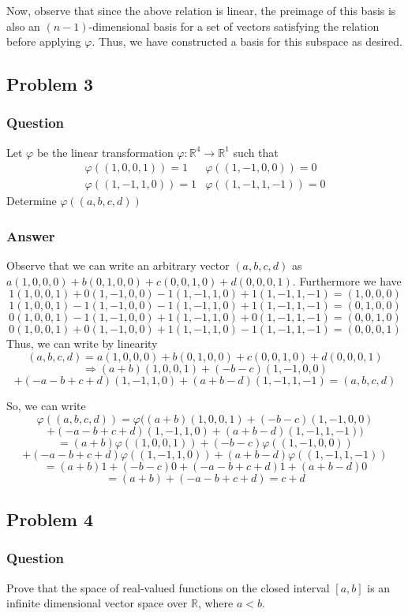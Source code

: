 \documentclass[12pt]{article}
\begin{document}
Now, observe that since the above relation is linear, the preimage of this basis is also an $(n-1)$-dimensional basis for a set of vectors satisfying the relation before applying $\varphi$. Thus, we have constructed a basis for this subspace as desired.
\subsection{Problem 3}

\subsubsection{Question}
Let $\varphi$ be the linear transformation $\varphi: \mathbb{R}^4 \to \mathbb{R}^1$ such that 
\[\begin{array}{ll}
\varphi((1,0,0,1))=1 & \varphi((1,-1,0,0))=0\\
\varphi((1,-1,1,0))=1 & \varphi((1,-1,1,-1))=0
\end{array}\]
Determine $\varphi((a,b,c,d))$
\subsubsection{Answer}
Observe that we can write an arbitrary vector $(a,b,c,d)$ as $a(1,0,0,0)+b(0,1,0,0)+c(0,0,1,0)+d(0,0,0,1)$. Furthermore we have 
\[1(1,0,0,1)+ 0(1,-1,0,0) -1(1,-1,1,0)+ 1(1,-1,1,-1) = (1,0,0,0)\]
\[1(1,0,0,1)-1(1,-1,0,0) -1(1,-1,1,0)+ 1(1,-1,1,-1) = (0,1,0,0)\]
\[0(1,0,0,1)-1(1,-1,0,0) +1(1,-1,1,0)+ 0(1,-1,1,-1) = (0,0,1,0)\]
\[0(1,0,0,1)+ 0(1,-1,0,0) +1(1,-1,1,0)- 1(1,-1,1,-1) = (0,0,0,1)\]
Thus, we can write by linearity
\[(a,b,c,d) = a(1,0,0,0)+b(0,1,0,0)+c(0,0,1,0)+d(0,0,0,1) \]
\[ \Rightarrow (a+b)(1,0,0,1)+ (-b-c)(1,-1,0,0) \]
\[+(-a-b+c+d)(1,-1,1,0)+ (a+b-d)(1,-1,1,-1) = (a,b,c,d)\]

So, we can write
\[\varphi((a,b,c,d)) = \varphi((a+b)(1,0,0,1)+ (-b-c)(1,-1,0,0) \]
\[+(-a-b+c+d)(1,-1,1,0)+ (a+b-d)(1,-1,1,-1)) \]
\[ = (a+b)\varphi((1,0,0,1))+ (-b-c)\varphi((1,-1,0,0)) \]
\[+(-a-b+c+d)\varphi((1,-1,1,0))+ (a+b-d)\varphi((1,-1,1,-1)) \]
\[ = (a+b)1+ (-b-c)0 +(-a-b+c+d)1+ (a+b-d)0 \]
\[ = (a+b) +(-a-b+c+d) = c+d\]
\subsection{Problem 4}

\subsubsection{Question}
Prove that the space of real-valued functions on the closed interval $[a,b]$ is an infinite dimensional vector space over $\mathbb{R}$, where $a<b$.
\end{document}
